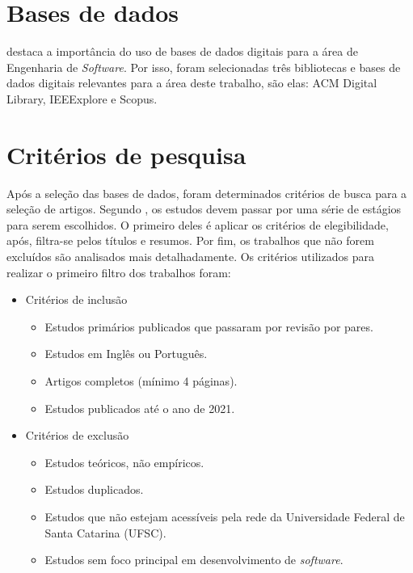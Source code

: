 \documentclass[
    12pt,       %
    openright,      %
    twoside,      %
    a4paper,      %
    english,      %
    french,       %
    spanish,      %
    brazil,       %
    ]{abntex2}
\begin{document}
\section{Bases de dados}

 destaca a importância do uso de bases de dados digitais para a área de Engenharia de \textit{Software}. Por isso, foram selecionadas três bibliotecas e bases de dados digitais relevantes para a área deste trabalho, são elas: ACM Digital Library, IEEExplore e Scopus. 

\section{Critérios de pesquisa}

Após a seleção das bases de dados, foram determinados critérios de busca para a seleção de artigos. Segundo , os estudos devem passar por uma série de estágios para serem escolhidos. O primeiro deles é aplicar os critérios de elegibilidade, após, filtra-se pelos títulos e resumos. Por fim, os trabalhos que não forem excluídos são analisados mais detalhadamente. Os critérios utilizados para realizar o primeiro filtro dos trabalhos foram:

\begin{itemize}
    \item Critérios de inclusão
        \begin{itemize}
            \item Estudos primários publicados que passaram por revisão por pares.            \item Estudos em Inglês ou Português.
            \item Artigos completos (mínimo 4 páginas).
            \item Estudos publicados até o ano de 2021.
        \end{itemize}
    \item Critérios de exclusão
        \begin{itemize}
            \item Estudos teóricos, não empíricos.
            \item Estudos duplicados.
            \item Estudos que não estejam acessíveis pela rede da Universidade Federal de Santa Catarina (UFSC).
            \item Estudos sem foco principal em desenvolvimento de \textit{software}.
        \end{itemize}
\end{itemize}
\end{document}
